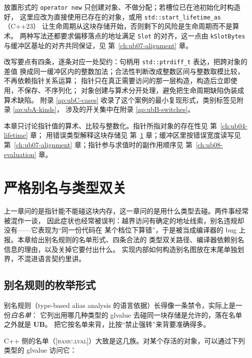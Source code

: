 \documentclass[12pt,a4paper,fontset=fandol]{ctexbook}
\newcommand{\cpp}[1]{C++#1}
\newcommand{\Tp}[1]{\texttt{#1}}
\newcommand{\Bk}{\discretionary{}{}{}}
\newcommand{\Lang}[1]{\textsf{#1}}
\newcommand{\CPP}{\Lang{C++}}
\newcommand{\UB}{\textbf{\textsf{UB}}}
\newcommand{\Std}[1]{\textsc{[#1]}}
\begin{document}
放置形式的 \Tp{operator new} 只创建对象、不做分配；若槽位已在池初始化时构造好，
这里应改为直接使用已存在的对象，或用 \Tp{std::start{\Bk}\_lifetime{\Bk}\_as}（\cpp{23}）
让生命周期从这块存储开始，否则剩下的风险是生命周期而不是算术。
两种写法还都要求偏移落点的地址满足 \Tp{Slot} 的对齐，这一点由 \Tp{kSlotBytes}
与缓冲区基址的对齐共同保证，见 第~\ref{ch:ub07-alignment} 章。

改写要点有四条，逐条对应一处契约：句柄用 \Tp{std::ptrdiff\_t} 表达，把跨对象的差值
换成同一缓冲区内的整数加法；合法性判断改成整数区间与整数取模比较，不再依赖指针关系运算；
指针只在真正需要访问的那一层构造，构造后立即使用，不保存、不序列化；
对象创建与算术分开处理，避免把生命周期缺陷伪装成算术缺陷。
附录 \ref{ap:ubC-cases} 收录了这个案例的最小复现形式，类别标签见附录 \ref{ap:ubA-kinds}，
涉及的开关集中在附录 \ref{ap:ubB-switches}。

\begin{note}[title={与相邻章节的接口}]
本章只讨论指针值的算术、比较与整数化。指针所指对象的存在性见 第~\ref{ch:ub04-lifetime} 章；
用错误类型解释这块存储见 第~\ref{ch:ub06-aliasing} 章；缓冲区里按错误宽度读写见
第~\ref{ch:ub07-alignment} 章；指针参与求值时的副作用顺序见 第~\ref{ch:ub08-evaluation} 章。
\end{note}

\chapter{严格别名与类型双关}\label{ch:ub06-aliasing}

上一章问的是指针能不能碰这块内存，这一章问的是用什么类型去碰。两件事经常被混作一谈，
因此症状也经常被误判：越界访问有确定的地址线索，别名违规却没有——它表现为“同一份代码在
某个档位下算错”，于是被当成编译器的 bug 上报。本章给出别名规则的名单形式、四条合法的
类型双关路径、编译器依赖别名信息的理由，以及关掉它要付出什么。
实现内部如何构造别名图放在末尾单独划界，不混进语言契约里讲。

\section{别名规则的枚举形式}\label{sec:ub06-rule}

别名规则（type-based alias analysis 的语言依据）长得像一条禁令，实际上是一份\emph{白名单}：
它列出用哪几种类型的 glvalue 去碰同一块存储是允许的，落在名单之外就是 \UB{}。
把它按名单来背，比按“禁止强转”来背要准确得多。

\CPP{} 侧的名单（\Std{basic.lval}）大致是这几族。对某个存活的对象，可以通过下列类型的
glvalue 访问它：
\end{document}
